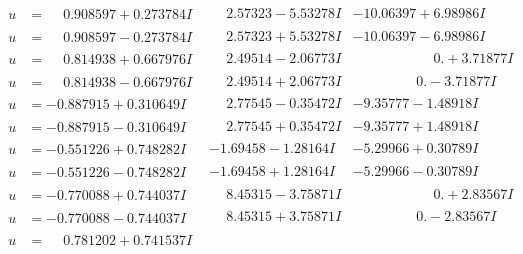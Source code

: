 \documentclass[1p]{elsarticle_modified}
\theoremstyle{definition}
\begin{document}
$$\begin{array}{c|c|c}
\begin{aligned}
u &= \phantom{-}0.908597 + 0.273784 I\end{aligned}
 & \phantom{-}2.57323 - 5.53278 I & -10.06397 + 6.98986 I \\ \hline\begin{aligned}
u &= \phantom{-}0.908597 - 0.273784 I\end{aligned}
 & \phantom{-}2.57323 + 5.53278 I & -10.06397 - 6.98986 I \\ \hline\begin{aligned}
u &= \phantom{-}0.814938 + 0.667976 I\end{aligned}
 & \phantom{-}2.49514 - 2.06773 I & \phantom{-0.000000 -}0. + 3.71877 I \\ \hline\begin{aligned}
u &= \phantom{-}0.814938 - 0.667976 I\end{aligned}
 & \phantom{-}2.49514 + 2.06773 I & \phantom{-0.000000 } 0. - 3.71877 I \\ \hline\begin{aligned}
u &= -0.887915 + 0.310649 I\end{aligned}
 & \phantom{-}2.77545 - 0.35472 I & -9.35777 - 1.48918 I \\ \hline\begin{aligned}
u &= -0.887915 - 0.310649 I\end{aligned}
 & \phantom{-}2.77545 + 0.35472 I & -9.35777 + 1.48918 I \\ \hline\begin{aligned}
u &= -0.551226 + 0.748282 I\end{aligned}
 & -1.69458 - 1.28164 I & -5.29966 + 0.30789 I \\ \hline\begin{aligned}
u &= -0.551226 - 0.748282 I\end{aligned}
 & -1.69458 + 1.28164 I & -5.29966 - 0.30789 I \\ \hline\begin{aligned}
u &= -0.770088 + 0.744037 I\end{aligned}
 & \phantom{-}8.45315 - 3.75871 I & \phantom{-0.000000 -}0. + 2.83567 I \\ \hline\begin{aligned}
u &= -0.770088 - 0.744037 I\end{aligned}
 & \phantom{-}8.45315 + 3.75871 I & \phantom{-0.000000 } 0. - 2.83567 I \\ \hline\begin{aligned}
u &= \phantom{-}0.781202 + 0.741537 I\end{aligned}

\end{array}$$
\end{document}
